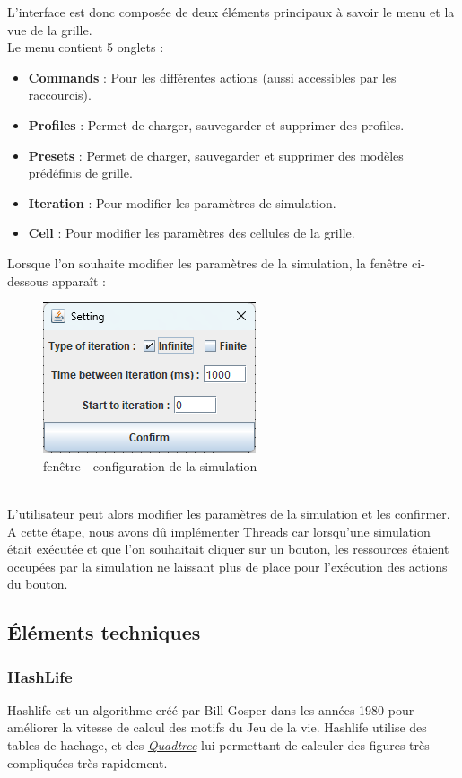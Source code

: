 \documentclass[12pt]{article}
\begin{document}
			\newpage
			L'interface est donc composée de deux éléments principaux à savoir le menu et la vue de la grille.\\ 
			Le menu contient 5 onglets : \\
			\begin{itemize}[label= ]
				\item \textbf{Commands} : Pour les différentes actions (aussi accessibles par les raccourcis).
				\item \textbf{Profiles} : Permet de charger, sauvegarder et supprimer des profiles.
				\item \textbf{Presets} : Permet de charger, sauvegarder et supprimer des modèles prédéfinis de grille.
				\item  \textbf{Iteration} : Pour modifier les paramètres de simulation.
				\item \textbf{Cell} : Pour modifier les paramètres des cellules de la grille.
			\end{itemize}
			
			Lorsque l'on souhaite modifier les paramètres de la simulation, la fenêtre ci-dessous apparaît :
			\begin{figure}[!ht]
				\centering
				\includegraphics[width=.5\textwidth]{images/jdialog.png}
				\caption{fenêtre - configuration de la simulation}
			\end{figure}\\
		
			L'utilisateur peut alors modifier les paramètres de la simulation et les confirmer. A cette étape, nous avons dû implémenter Threads 
			car lorsqu'une simulation était exécutée et que l'on souhaitait cliquer sur un bouton, les ressources étaient occupées 
			par la simulation ne laissant plus de place pour l'exécution des actions du bouton.
			
			
			\subsection{Éléments techniques}
			\subsubsection{HashLife} \label{hashlife}
			Hashlife est un algorithme créé par Bill Gosper dans les années 1980 pour améliorer la vitesse de calcul des motifs du Jeu de la vie. 
			Hashlife utilise des tables de hachage, et des \href{https://fr.wikipedia.org/wiki/Quadtree}{\emph{Quadtree}} lui permettant de calculer des figures très compliquées très rapidement.
			
\end{document}
